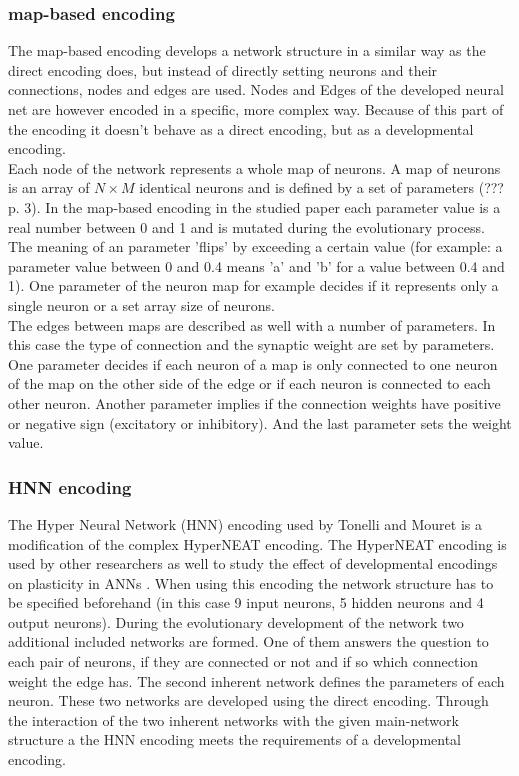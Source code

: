 \documentclass[12pt,twoside]{article}
\theoremstyle{plain}
\theoremstyle{definition}
\theoremstyle{remark}
\begin{document}
\subsubsection{map-based encoding}
The map-based encoding develops a network structure in a similar way as the direct encoding does, but instead of directly setting neurons and their connections, nodes and edges are used.
Nodes and Edges of the developed neural net are however encoded in a specific, more complex way. Because of this part of the encoding it doesn't behave as a direct encoding, but as a developmental encoding.\\
Each node of the network represents a whole map of neurons. A map of neurons is an array of $N \times M$ identical neurons and is defined by a set of parameters (??? \cite{tonelli2011using} p. 3). 
In the map-based encoding in the studied paper each parameter value is a real number between 0 and 1 and is mutated during the evolutionary process.
The meaning of an parameter 'flips' by exceeding a certain value (for example: a parameter value between 0 and 0.4 means 'a' and 'b' for a value between 0.4 and 1).
One parameter of the neuron map for example decides if it represents only a single neuron or a set array size of neurons.\\
The edges between maps are described as well with a number of parameters.
In this case the type of connection and the synaptic weight are set by parameters.
One parameter decides if each neuron of a map is only connected to one neuron of the map on the other side of the edge or if each neuron is connected to each other neuron.
Another parameter implies if the connection weights have positive or negative sign (excitatory or inhibitory). And the last parameter sets the weight value.

\subsubsection{HNN encoding}
The Hyper Neural Network (HNN) encoding used by Tonelli and Mouret is a modification of the complex HyperNEAT encoding. The HyperNEAT encoding is used by other researchers as well to study the effect of developmental encodings on plasticity in ANNs \cite{clune2010investigating} \cite{verbancsics2011constraining}.
When using this encoding the network structure has to be specified beforehand (in this case 9 input neurons, 5 hidden neurons and 4 output neurons).
During the evolutionary development of the network two additional included networks are formed. One of them answers the question to each pair of neurons, if they are connected or not and if so which connection weight the edge has.
The second inherent network defines the parameters of each neuron. These two networks are developed using the direct encoding.
Through the interaction of the two inherent networks with the given main-network structure a the HNN encoding meets the requirements of a developmental encoding.
\end{document}
